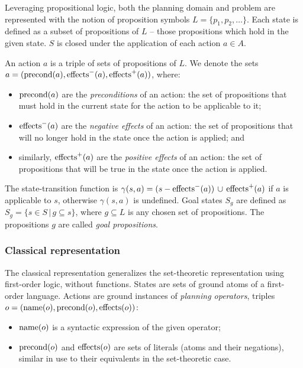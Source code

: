 Leveraging propositional logic, both the planning domain and problem
are represented with the notion
of proposition symbols $L = \{p_1, p_2, \ldots\}$.
Each state is defined as a subset of propositions of $L$ -- those propositions
which hold in the given state. $S$ is closed under the application of each
action $a \in A$.

An action $a$
is a triple of sets of propositions of $L$.
We denote the sets $a = (\operatorname{\textrm{precond}}(a), \operatorname{\textrm{effects}}^-(a), \operatorname{\textrm{effects}}^+(a))$, where:
\begin{itemize}
\item $\operatorname{\textrm{precond}}(a)$ are the \textit{preconditions} of an action: the set of
propositions that must hold in the current state for the action to be applicable to it;
\item $\operatorname{\textrm{effects}}^-(a)$ are the \textit{negative effects} of an action:
the set of propositions
that will no longer hold in the state once the action is applied; and
\item similarly, $\operatorname{\textrm{effects}}^+(a)$ are the \textit{positive effects} of an action:
the set of propositions that will be true in the state once the action is applied.
\end{itemize}

The state-transition function is $\gamma(s, a) = (s - \operatorname{\textrm{effects}}^-(a)) \,\cup\,
\operatorname{\textrm{effects}}^+(a)$ if $a$ is applicable to $s$,
otherwise $\gamma(s, a)$ is undefined. Goal states $S_g$ are defined as
$S_g = \{s \in S \,|\, g \subseteq s\}$, where
$g \subseteq L$ is any chosen set of propositions. The propositions $g$ are called
\textit{goal propositions}.

\subsubsection{Classical representation}

The classical representation generalizes the set-theoretic representation using first-order logic,
without functions.
States are sets of ground atoms of a first-order language.
Actions are ground instances of \textit{planning operators},
triples $o = (\operatorname{\textrm{name}}(o), \operatorname{\textrm{precond}}(o), \operatorname{\textrm{effects}}(o))$:

\begin{itemize}
\item $\operatorname{\textrm{name}}(o)$ is a syntactic expression of the given operator;
\item $\operatorname{\textrm{precond}}(o)$ and $\operatorname{\textrm{effects}}(o)$ are sets of literals
(atoms and their negations), similar in use to their equivalents
in the set-theoretic case.
\end{itemize}

